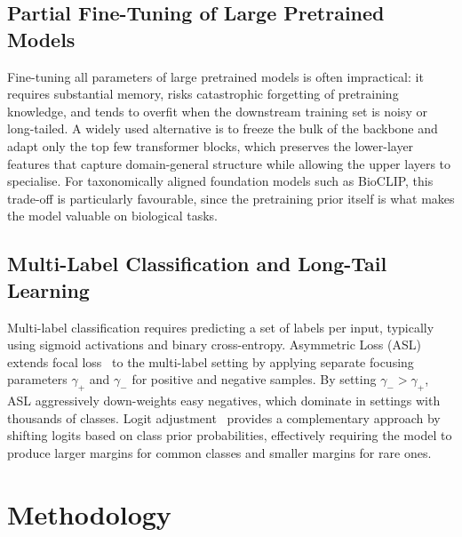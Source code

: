 \documentclass[sigconf]{ceurart}
\begin{document}
\subsection{Partial Fine-Tuning of Large Pretrained Models}
Fine-tuning all parameters of large pretrained models is often impractical: it requires substantial memory, risks catastrophic forgetting of pretraining knowledge, and tends to overfit when the downstream training set is noisy or long-tailed. A widely used alternative is to freeze the bulk of the backbone and adapt only the top few transformer blocks, which preserves the lower-layer features that capture domain-general structure while allowing the upper layers to specialise. For taxonomically aligned foundation models such as BioCLIP, this trade-off is particularly favourable, since the pretraining prior itself is what makes the model valuable on biological tasks.
\subsection{Multi-Label Classification and Long-Tail Learning}
Multi-label classification requires predicting a set of labels per input, typically using sigmoid activations and binary cross-entropy. Asymmetric Loss (ASL)~\cite{ridnik2021asymmetric} extends focal loss~\cite{lin2017focal} to the multi-label setting by applying separate focusing parameters $\gamma_+$ and $\gamma_-$ for positive and negative samples. By setting $\gamma_- > \gamma_+$, ASL aggressively down-weights easy negatives, which dominate in settings with thousands of classes.
Logit adjustment~\cite{menon2021longtail} provides a complementary approach by shifting logits based on class prior probabilities, effectively requiring the model to produce larger margins for common classes and smaller margins for rare ones.
\section{Methodology}
\label{sec:method}
\end{document}
